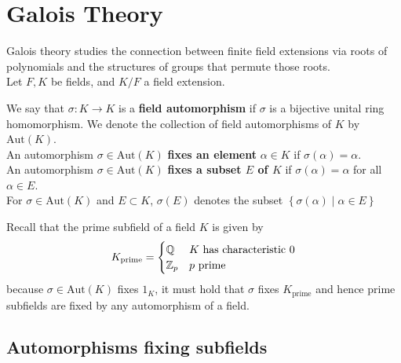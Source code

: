 \documentclass{memoir}
\begin{document}


\chapter{Galois Theory}
\label{cha:galois_theory}

Galois theory studies the connection between finite field extensions via roots of polynomials and the structures of groups that permute those roots.\\

Let \(F,K\) be fields, and \(K / F\) a field extension.

\begin{defn}
	We say that \(\sigma :K\to K\) is a \textbf{field automorphism} if \(\sigma \) is a bijective unital ring homomorphism. We denote the collection of field automorphisms of \(K\) by \(\textrm{Aut}(K)\).\\

	An automorphism \(\sigma  \in \textrm{Aut}(K)\) \textbf{fixes an element} \(\alpha  \in K\) if \(\sigma (\alpha )=\alpha \).\\

	An automorphism \(\sigma \in \textrm{Aut}(K)\) \textbf{fixes a subset \(E\) of \(K\)} if \(\sigma (\alpha ) = \alpha \) for all \(\alpha  \in E\).\\

	For \(\sigma  \in \textrm{Aut}(K)\) and \(E\subset K\), \(\sigma (E)\) denotes the subset \(\left\{\sigma (\alpha ) \mid \alpha \in E \right\} \)
\end{defn}
Recall that the prime subfield of a field \(K\) is given by
\begin{align*}
	K_{\textrm{prime}} = \begin{cases}
		\mathbb{Q} & K \text{ has characteristic 0}\\
		\mathbb{Z}_p & \text{\(p\) prime}
	\end{cases}
\end{align*}
because \(\sigma \in \textrm{Aut}(K)\) fixes \(1_K\), it must hold that \(\sigma \) fixes \(K_{\textrm{prime}}\) and hence prime subfields are fixed by any automorphism of a field.

\section{Automorphisms fixing subfields}
\label{sec:automorphisms_fixing_subfields}
\end{document}
